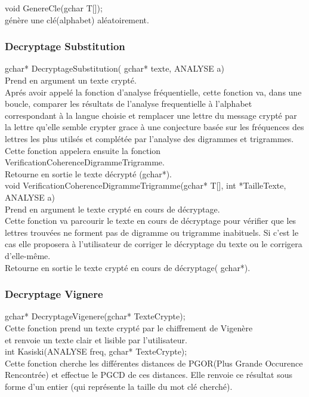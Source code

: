\documentclass[a4]{article}
\begin{document}
	void GenereCle(gchar T[]);\\
		génère une clé(alphabet) aléatoirement.
	
	\subsubsection{Decryptage Substitution}
	gchar* DecryptageSubstitution( gchar* texte, ANALYSE a)\\
		Prend en argument un texte crypté.\\
		Aprés avoir appelé la fonction d'analyse fréquentielle, cette fonction va, 
		dans une boucle, comparer les résultats de l'analyse frequentielle à l'alphabet
		 correspondant à la langue choisie et remplacer une lettre du message crypté 
		 par la lettre qu'elle semble crypter grace à une conjecture basée sur les 
		 fréquences des lettres les plus utilsés et complétée par l'analyse des digrammes 
		 et trigrammes. Cette fonction appelera ensuite la fonction VerificationCoherenceDigrammeTrigramme.\\
		Retourne en sortie le texte décrypté (gchar*).\\


	void VerificationCoherenceDigrammeTrigramme(gchar* T[], int *TailleTexte, ANALYSE a)\\
		Prend en argument le texte crypté en cours de décryptage.\\
		Cette fonction va parcourir le texte en cours de décryptage pour vérifier que les lettres trouvées 
		ne forment pas de digramme ou trigramme inabituels. Si c'est le cas elle proposera à l'utilisateur 
		de corriger le décryptage du texte ou le corrigera d'elle-même.\\
		Retourne en sortie le texte crypté en cours de décryptage( gchar*).\\
	
	
	\subsubsection{Decryptage Vignere}
	gchar* DecryptageVigenere(gchar* TexteCrypte);\\
		Cette fonction prend un texte crypté par le chiffrement de Vigenère \\
		et renvoie un texte clair et lisible par l'utilisateur.\\
	
	int Kasiski(ANALYSE freq, gchar* TexteCrypte);\\
		Cette fonction cherche les différentes distances de PGOR(Plus Grande Occurence Rencontrée) et effectue
		le PGCD de ces distances. Elle renvoie ce résultat sous forme d'un entier (qui représente la taille du mot clé cherché).\\
	
\end{document}
